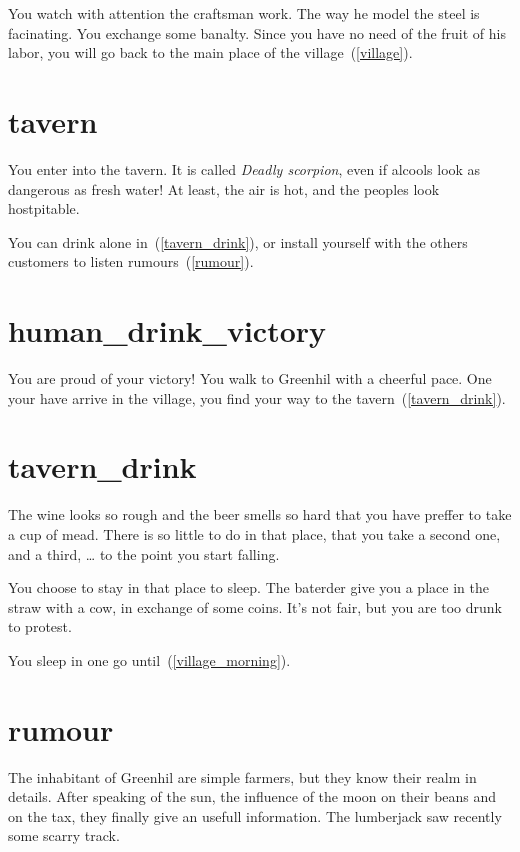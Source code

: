 You watch with attention the craftsman work. The way he model the steel is
facinating. You exchange some banalty. Since you have no need of the fruit
of his labor, you will go back to the main place of the village~(\ref{village}).

\section{tavern}

You enter into the tavern. It is called \textit{Deadly scorpion}, even if
alcools look as dangerous as fresh water! At least, the air is hot, and the
peoples look hostpitable.

You can drink alone in~(\ref{tavern_drink}), or install yourself with the others
customers to listen rumours~(\ref{rumour}).

\section{human_drink_victory}

You are proud of your victory! You walk to Greenhil with a cheerful pace. One
your have arrive in the village, you find your way to the tavern~(\ref{tavern_drink}).

\section{tavern_drink}

The wine looks so rough and the beer smells so hard that you have preffer to
take a cup of mead. There is so little to do in that place, that you take a
second one, and a third, … to the point you start falling.

You choose to stay in that place to sleep. The baterder give you a place in the
straw with a cow, in exchange of some coins. It's not fair, but you are too drunk
to protest.

You sleep in one go until~(\ref{village_morning}).

\section{rumour}

The inhabitant of Greenhil are simple farmers, but they know their realm in
details. After speaking of the sun, the influence of the moon on their beans and
on the tax, they finally give an usefull information. The lumberjack saw
recently some scarry track.

